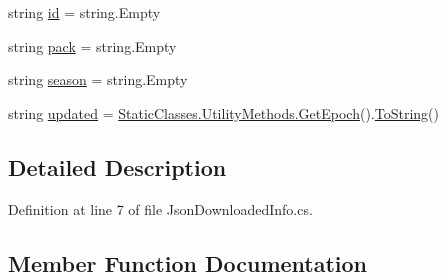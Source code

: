 \begin{DoxyCompactItemize}
\item 
string \mbox{\hyperlink{class_little_weeb_library_1_1_models_1_1_json_downloaded_info_aeb59734113f03f4435a5a2d51c1d6f5c}{id}} = string.\+Empty
\item 
string \mbox{\hyperlink{class_little_weeb_library_1_1_models_1_1_json_downloaded_info_ab7ef459c62e838dd50d1519a63f374a6}{pack}} = string.\+Empty
\item 
string \mbox{\hyperlink{class_little_weeb_library_1_1_models_1_1_json_downloaded_info_ac181fee7a26fa42b576b66a4d8febbe2}{season}} = string.\+Empty
\item 
string \mbox{\hyperlink{class_little_weeb_library_1_1_models_1_1_json_downloaded_info_a60ae790ecf3f0779b1e6d94964970ff1}{updated}} = \mbox{\hyperlink{class_little_weeb_library_1_1_static_classes_1_1_utility_methods_a12336d9e64983ddabaad8950486fafb2}{Static\+Classes.\+Utility\+Methods.\+Get\+Epoch}}().\mbox{\hyperlink{class_little_weeb_library_1_1_models_1_1_json_downloaded_info_a1ffa120527f102b7bf96a4c0a2d9e298}{To\+String}}()
\end{DoxyCompactItemize}


\subsection{Detailed Description}


Definition at line 7 of file Json\+Downloaded\+Info.\+cs.



\subsection{Member Function Documentation}
\mbox{\label{class_little_weeb_library_1_1_models_1_1_json_downloaded_info_ad96946eb69871859ec8e765663e8b151}} 
